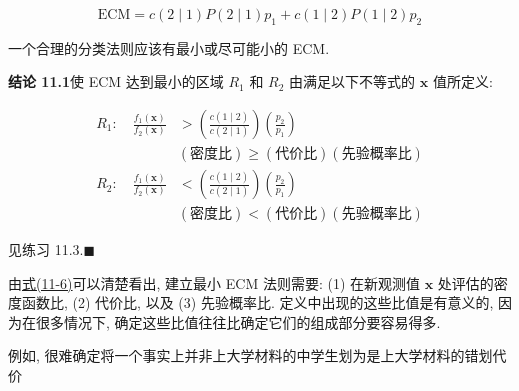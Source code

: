 \label{eq:11-5}
\begin{equation}
\mathrm{ECM}=c(2\mid1)P(2\mid1)p_1+c(1\mid2)P(1\mid2)p_2
\tag{11-5}
\end{equation}

一个合理的分类法则应该有最小或尽可能小的 ECM.

\noindent\textbf{结论 11.1}\quad 使 ECM 达到最小的区域 $R_1$ 和 $R_2$ 由满足以下不等式的 $\mathbf{x}$ 值所定义:

\label{eq:11-6}
\begin{equation}
\begin{aligned}
R_1:\quad \frac{f_1(\mathbf{x})}{f_2(\mathbf{x})}&>\left(\frac{c(1\mid2)}{c(2\mid1)}\right)\left(\frac{p_2}{p_1}\right)\\
&(\text{密度比})\geqslant(\text{代价比})(\text{先验概率比})\\[6pt]
R_2:\quad \frac{f_1(\mathbf{x})}{f_2(\mathbf{x})}&<\left(\frac{c(1\mid2)}{c(2\mid1)}\right)\left(\frac{p_2}{p_1}\right)\\
&(\text{密度比})<(\text{代价比})(\text{先验概率比})
\end{aligned}
\tag{11-6}
\end{equation}

\noindent{}\quad 见练习 11.3.\hfill$\blacksquare$

由\hyperref[eq:11-6]{式(11-6)}可以清楚看出, 建立最小 ECM 法则需要: (1) 在新观测值 $\mathbf{x}$ 处评估的密度函数比, (2) 代价比, 以及 (3) 先验概率比. 定义中出现的这些比值是有意义的, 因为在很多情况下, 确定这些比值往往比确定它们的组成部分要容易得多.

例如, 很难确定将一个事实上并非上大学材料的中学生划为是上大学材料的错划代价
